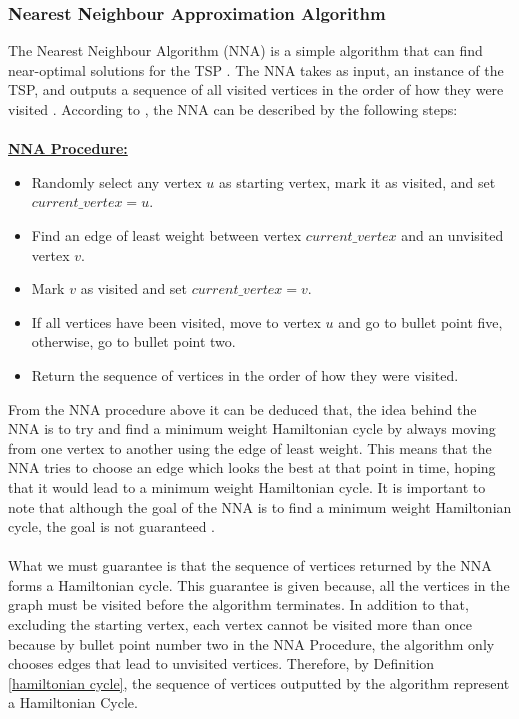 \documentclass[12pt]{article}
\numberwithin{equation}{subsection}
\numberwithin{table}{subsection}
\begin{document}
\subsubsection{Nearest Neighbour Approximation Algorithm}
\label{nna_section}
The Nearest Neighbour Algorithm (NNA) is a simple algorithm that can find near-optimal solutions for the TSP \cite{arora_agarwal_tanwar_2016}. The NNA takes as input, an instance of the TSP, and outputs a sequence of all visited vertices in the order of how they were visited \cite{arora_agarwal_tanwar_2016}. According to \cite{arora_agarwal_tanwar_2016}, the NNA can be described by the following steps:\\\\
\underline{\textbf{NNA Procedure:}}
\begin{itemize}
\itemsep0em
\item Randomly select any vertex $u$ as starting vertex, mark it as visited, and set $current\_vertex = u$.
\item Find an edge of least weight between vertex $current\_vertex$ and an unvisited vertex $v$.
\item Mark $v$ as visited and set $current\_vertex = v$.
\item If all vertices have been visited, move to vertex $u$ and go to bullet point five, otherwise, go to bullet point two.
\item Return the sequence of vertices in the order of how they were visited.
\end{itemize}
From the NNA procedure above it can be deduced that, the idea behind the NNA is to try and find a minimum weight Hamiltonian cycle by always moving from one vertex to another using the edge of least weight. This means that the NNA tries to choose an edge which looks the best at that point in time, hoping that it would lead to a minimum weight Hamiltonian cycle. It is important to note that although the goal of the NNA is to find a minimum weight Hamiltonian cycle, the goal is not guaranteed \cite{khan_agrawal_2016}.
\\\\What we must guarantee is that the sequence of vertices returned by the NNA forms a Hamiltonian cycle. This guarantee is given because, all the vertices in the graph must be visited before the algorithm terminates. In addition to that, excluding the starting vertex, each vertex cannot be visited more than once because by bullet point number two in the NNA Procedure, the algorithm only chooses edges that lead to unvisited vertices. Therefore, by Definition \ref{hamiltonian cycle}, the sequence of vertices outputted by the algorithm represent a Hamiltonian Cycle.
\end{document}
